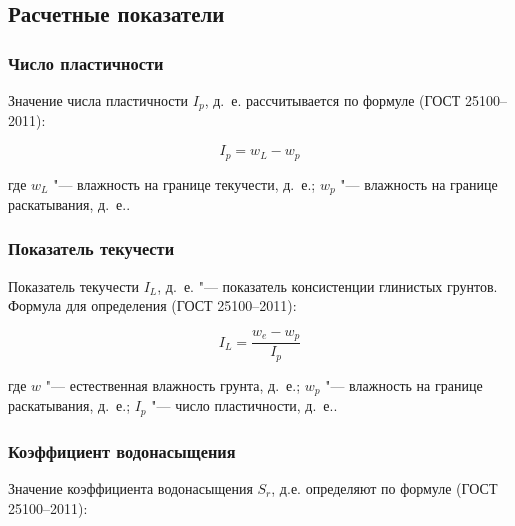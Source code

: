 
\subsection{Расчетные показатели}

\subsubsection{Число пластичности}

 Значение числа пластичности $I_p$, д.~е. рассчитывается по формуле (ГОСТ 25100--2011):

 \[
    I_p = w_L-w_p
 \]

 где $w_L$ "--- влажность на границе текучести, д.~е.;
 $w_p$ "--- влажность на границе раскатывания, д.~е..
 
\subsubsection{Показатель текучести}

 Показатель текучести $I_L$, д.~е. "--- показатель консистенции глинистых грунтов.
 Формула для определения (ГОСТ 25100--2011): 

\[
   I_L = \frac{w_e - w_p}{I_p}
\]

где $w$ "--- естественная влажность грунта, д.~е.;
$w_p$ "--- влажность на границе раскатывания, д.~е.;
$I_p$ "--- число пластичности, д.~е..

\subsubsection{Коэффициент водонасыщения}

Значение коэффициента водонасыщения $S_r$, д.е. определяют по формуле (ГОСТ 25100--2011):

